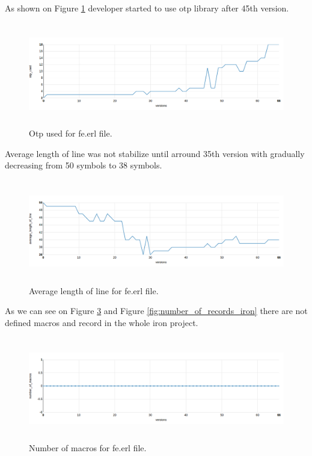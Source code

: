 As shown on Figure \ref{fig:otp_iron} developer started to use otp library after 45th version. 

\begin{figure}[h]
	\centering
	\includegraphics[height=45mm]{figures/otp_iron.png}
	\caption{Otp used for fe.erl file.}
	\label{fig:otp_iron}
\end{figure}

Average length of line was not stabilize until arround 35th version with gradually decreasing from 50 symbols to 38 symbols.

\begin{figure}[h]
	\centering
	\includegraphics[height=45mm]{figures/average_length_of_line_iron.png}
	\caption{Average length of line for fe.erl file.}
	\label{fig:average_length_of_line_iron}
\end{figure}

As we can see on Figure \ref{fig:number_of_macros_iron} and Figure \ref{fig:number_of_records_iron} there are not defined macros and record in the whole iron project.

\begin{figure}[h]
	\centering
	\includegraphics[height=45mm]{figures/number_of_macros_iron.png}
	\caption{Number of macros for fe.erl file.}
	\label{fig:number_of_macros_iron}
\end{figure}

